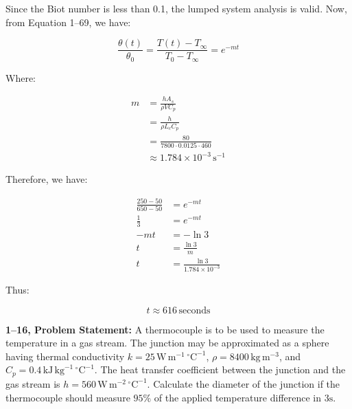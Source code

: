 \documentclass[letterpaper,12pt]{article}
\begin{document}
Since the Biot number is less than 0.1, the lumped system analysis is valid. Now, from Equation 1--69, we have:

\begin{equation}
    \frac{\theta(t)}{\theta_0} = \frac{T(t) - T_{\infty}}{T_0 - T_{\infty}} = e^{-mt}
\end{equation}

Where:

\begin{equation}
\begin{aligned}
    m &= \frac{h A_s}{\rho V C_p} \\
      &= \frac{h}{\rho L_c C_p} \\
      &= \frac{80}{7800 \cdot 0.0125 \cdot 460} \\
      &\approx 1.784 \times 10^{-3} \, \mathrm{s}^{-1}
\end{aligned}
\end{equation}

Therefore, we have:

\begin{equation}
\begin{aligned}
    \frac{250 - 50}{650 - 50} &= e^{-mt} \\
                  \frac{1}{3} &= e^{-mt} \\
                          -mt &= - \ln{3} \\
                            t &= \frac{\ln{3}}{m} \\
                            t &= \frac{\ln{3}}{1.784 \times 10^{-3}}
\end{aligned}
\end{equation}

Thus:

\begin{equation}
\boxed{
    t \approx 616 \, \mathrm{seconds}
}
\end{equation}

\vspace{6pt}


\textbf{1--16, Problem Statement:}
A thermocouple is to be used to measure the temperature in a gas stream. The junction may be approximated as a sphere having thermal conductivity $k = 25\, \text{W}\, \text{m}^{-1}\, {}^{\circ} \text{C}^{-1}$, $\rho = 8400\, \text{kg}\, \text{m}^{-3}$, and $C_{p} = 0.4\, \text{kJ}\, \text{kg}^{-1}\, {}^{\circ} \text{C}^{-1}$. The heat transfer coefficient between the junction and the gas stream is $h = 560\, \text{W}\,\text{m}^{-2}\,{}^\circ\text{C}^{-1}$. Calculate the diameter of the junction if the thermocouple should measure $95\%$ of the applied temperature difference in $3\text{s}$.
\end{document}
